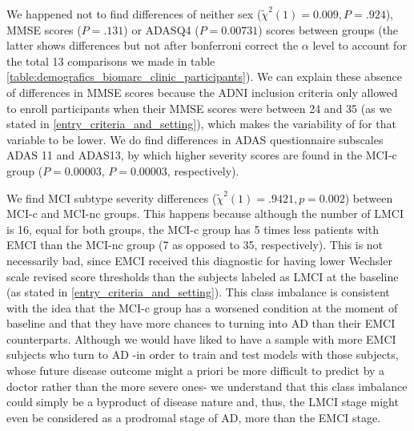 \documentclass[a4paper,12pt]{elsarticle}  %
\begin{document}
			\FloatBarrier	
		
		
	
		
		We happened not to find differences of neither sex ($\tilde{\chi}^2 (1) = 0.009, P = .924$), MMSE scores ($P = .131$) or ADASQ4 ($P = 0.00731$) scores between groups (the latter shows differences but not after bonferroni correct the $\alpha$ level to account for the total 13 comparisons we made in table \ref{table:demografics_biomarc_clinic_participants}). We can explain these absence of differences in MMSE scores because the ADNI inclusion criteria only allowed to enroll participants when their MMSE scores were between 24 and 35 (as we stated in \ref{entry_criteria_and_setting}), which makes the variability of for that variable to be lower. We do find differences in ADAS questionnaire subscales ADAS 11 and ADAS13, by which higher severity scores are found in the MCI-c group  ($P = 0.00003$, $P = 0.00003$, respectively).
		

		
		We find MCI subtype severity differences ($\tilde{\chi}^2 (1) = .9421, p= 0.002$) between MCI-c and MCI-nc groups. This happens because although the number of LMCI is 16, equal for both groups, the MCI-c group has 5 times less patients with EMCI than the MCI-nc group (7 as opposed to 35, respectively). This is not necessarily bad, since EMCI received this diagnostic for having lower Wechsler scale revised score thresholds than the subjects labeled as LMCI at the baseline (as stated in \ref{entry_criteria_and_setting}). This class imbalance is consistent with the idea that the MCI-c group has a worsened condition at the moment of baseline and that they have more chances to turning into AD than their EMCI counterparts. Although we would have liked to have a sample with more EMCI subjects who turn to AD -in order to train and test models with those subjects, whose future disease outcome might a priori be more difficult to predict by a doctor rather than the more severe ones- we understand that this class imbalance could simply be a byproduct of disease nature and, thus, the LMCI stage might even be considered as a prodromal stage of AD, more than the EMCI stage.
		
\end{document}

